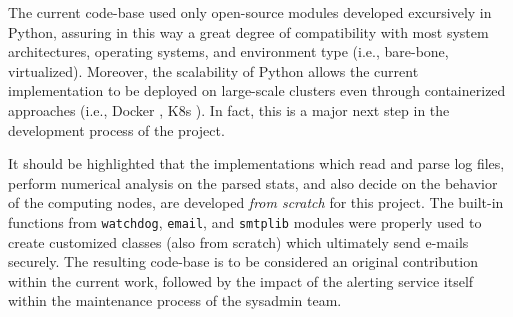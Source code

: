 \documentclass[conference]{IEEEtran}
\begin{document}
\par The current code-base used only open-source modules developed excursively in Python, assuring in this way a great degree of compatibility with most system architectures, operating systems, and environment type (i.e., bare-bone, virtualized). Moreover, the scalability of Python allows the current implementation to be deployed on large-scale clusters even through containerized approaches (i.e., Docker \cite{merkel2014docker}, K8s \cite{brewer2015kubernetes}). In fact, this is a major next step in the development process of the project.

\par It should be highlighted that the implementations which read and parse log files, perform numerical analysis on the parsed stats, and also decide on the behavior of the computing nodes, are developed \emph{from scratch} for this project. The built-in functions from \texttt{watchdog}, \texttt{email}, and \texttt{smtplib} modules were properly used to create customized classes (also from scratch) which ultimately send e-mails securely. The resulting code-base is to be considered an original contribution within the current work, followed by the impact of the alerting service itself within the maintenance process of the sysadmin team.
\end{document}
